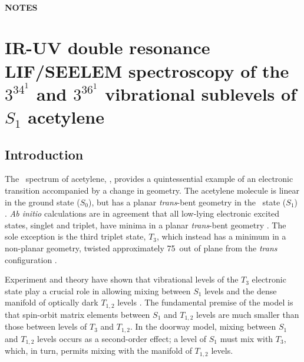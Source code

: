 \documentclass[12pt]{mitthesis}
\begin{document}
\tableofcontents
\clearpage


\subsubsection*{NOTES}
\clearpage

\setcounter{chapter}{5}
\chapter{  IR-UV double resonance LIF/SEELEM spectroscopy of the
  $3^34^1$  and $3^36^1$  vibrational sublevels of $S_1$
  acetylene}

\section{Introduction}

The \AtoX\ spectrum of acetylene, , provides a quintessential
example of an electronic transition accompanied by a change in
geometry.  The acetylene molecule is linear in the ground state ($S_0$),
but has a planar \emph{trans}-bent geometry in the \astate\ state
($S_1$) \cite{ingold, vanveen}.  \emph{Ab initio} calculations are in
agreement that all low-lying electronic excited states, singlet and
triplet, have minima in a planar \emph{trans}-bent geometry \cite{all,
  abinitio, papers}.  The sole exception is the third triplet state,
$T_3$, which instead has a minimum in a non-planar geometry, twisted
approximately 75\degrees\ out of plane from the \emph{trans}
configuration \cite{cui96, ventura03, thom07}.

Experiment and theory have shown that vibrational levels of the $T_3$
electronic state play a crucial role in allowing mixing between $S_1$
levels and the dense manifold of optically dark $T_{1,2}$ levels
\cite{humphrey97, altunata00, dupre93, cui97, thom07, ventura03}.  The
fundamental premise of the model is that spin-orbit matrix elements
between $S_1$ and $T_{1,2}$ levels are much smaller than those between
levels of $T_3$ and $T_{1,2}$.  In the doorway model, mixing between
$S_1$ and $T_{1,2}$ levels occurs as a second-order effect; a level
of $S_1$ must mix with $T_3$, which, in turn, permits mixing with the
manifold of $T_{1,2}$ levels.

\end{document}
